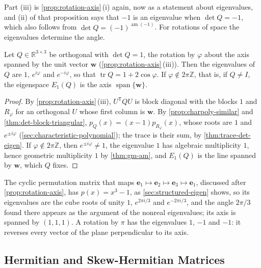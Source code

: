 Part (iii) is \cref{prop:rotation-axis}\,(i) again, now as a statement about eigenvalues, and (ii) of that proposition says that $-1$ is an eigenvalue when $\det Q=-1$, which also follows from $\det Q=(-1)^{\operatorname{am}(-1)}$. For rotations of space the eigenvalues determine the angle.

\begin{proposition}
\label{prop:rotation-eigen}
Let $Q\in\mathbb R^{3\times3}$ be orthogonal with $\det Q=1$, the rotation by $\varphi$ about the axis spanned by the unit vector $\mathbf w$ (\cref{prop:rotation-axis}\,(iii)). Then the eigenvalues of $Q$ are $1$, $e^{i\varphi}$ and $e^{-i\varphi}$, so that $\operatorname{tr}Q=1+2\cos\varphi$. If $\varphi\notin2\pi\mathbb Z$, that is, if $Q\ne I$, the eigenspace $E_1(Q)$ is the axis $\operatorname{span}\{\mathbf w\}$.
\end{proposition}

\begin{proof}
By \cref{prop:rotation-axis}\,(iii), $U^{\mathsf T}QU$ is block diagonal with the blocks $1$ and $R_\varphi$ for an orthogonal $U$ whose first column is $\mathbf w$. By \cref{prop:charpoly-similar} and \cref{thm:det-block-triangular}, $p_Q(x)=(x-1)p_{R_\varphi}(x)$, whose roots are $1$ and $e^{\pm i\varphi}$ (\cref{sec:characteristic-polynomial}); the trace is their sum, by \cref{thm:trace-det-eigen}. If $\varphi\notin2\pi\mathbb Z$, then $e^{\pm i\varphi}\ne1$, the eigenvalue $1$ has algebraic multiplicity $1$, hence geometric multiplicity $1$ by \cref{thm:gm-am}, and $E_1(Q)$ is the line spanned by $\mathbf w$, which $Q$ fixes.
\end{proof}

The cyclic permutation matrix that maps $\mathbf e_1\mapsto\mathbf e_2\mapsto\mathbf e_3\mapsto\mathbf e_1$, discussed after \cref{prop:rotation-axis}, has $p(x)=x^3-1$, as \cref{sec:structured-eigen} shows, so its eigenvalues are the cube roots of unity $1$, $e^{2\pi i/3}$ and $e^{-2\pi i/3}$, and the angle $2\pi/3$ found there appears as the argument of the nonreal eigenvalues; its axis is spanned by $(1,1,1)$. A rotation by $\pi$ has the eigenvalues $1$, $-1$ and $-1$: it reverses every vector of the plane perpendicular to its axis.

\subsection{Hermitian and Skew-Hermitian Matrices}

